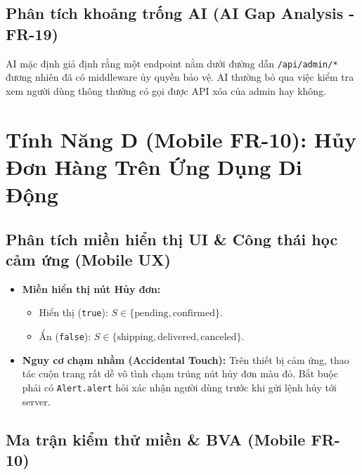 \documentclass[11pt,a4paper]{article}
\begin{document}
\subsection{Phân tích khoảng trống AI (AI Gap Analysis - FR-19)}
AI mặc định giả định rằng một endpoint nằm dưới đường dẫn \texttt{/api/admin/*} đương nhiên đã có middleware ủy quyền bảo vệ. AI thường bỏ qua việc kiểm tra xem người dùng thông thường có gọi được API xóa của admin hay không.

\newpage

\section{Tính Năng D (Mobile FR-10): Hủy Đơn Hàng Trên Ứng Dụng Di Động}

\subsection{Phân tích miền hiển thị UI \& Công thái học cảm ứng (Mobile UX)}
\begin{itemize}
    \item \textbf{Miền hiển thị nút Hủy đơn:}
    \begin{itemize}
        \item Hiển thị (\texttt{true}): $S \in \{\text{pending}, \text{confirmed}\}$.
        \item Ẩn (\texttt{false}): $S \in \{\text{shipping}, \text{delivered}, \text{canceled}\}$.
    \end{itemize}
    \item \textbf{Nguy cơ chạm nhầm (Accidental Touch):} Trên thiết bị cảm ứng, thao tác cuộn trang rất dễ vô tình chạm trúng nút hủy đơn màu đỏ. Bắt buộc phải có \texttt{Alert.alert} hỏi xác nhận người dùng trước khi gửi lệnh hủy tới server.
\end{itemize}

\subsection{Ma trận kiểm thử miền \& BVA (Mobile FR-10)}
\end{document}
